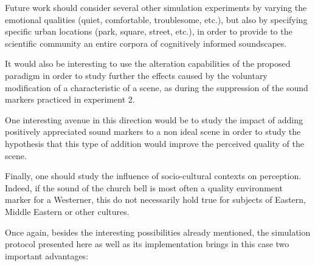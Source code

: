 \documentclass[preprint,12pt]{elsarticle}
\begin{document}
Future work should consider several other simulation experiments by varying the emotional qualities (quiet, comfortable, troublesome, etc.), but also by specifying specific urban locations (park, square, street, etc.), in order to provide to the scientific community an entire corpora of cognitively informed soundscapes.


It would also be interesting to use the alteration capabilities of the proposed paradigm in order to study further the effects caused by the voluntary modification of a characteristic of a scene, as during the suppression of the sound markers practiced in experiment 2.


One interesting avenue in this direction would be to study the impact of adding positively appreciated sound markers to a non ideal scene in order to study the hypothesis that this type of addition would improve the perceived quality of the scene.


Finally, one should study the influence of socio-cultural contexts on perception. Indeed, if the sound of the church bell is most often a quality environment marker for a Westerner, this do not necessarily hold true for subjects of Eastern, Middle Eastern or other cultures.


Once again, besides the interesting possibilities already mentioned, the simulation protocol presented here as well as its implementation brings in this case two important advantages:
\end{document}
